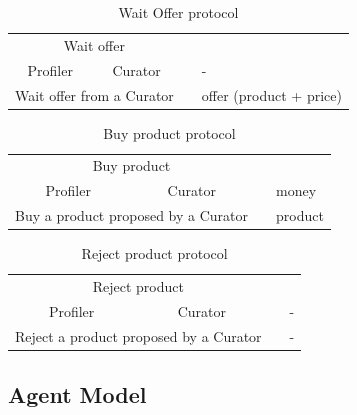 \documentclass[a4paper,11pt]{report}
\begin{document}
  \begin{table}[ht!]
  \centering
  \begin{tabular}{|c|l|c|l|ll}
  \cline{1-4}
  \multicolumn{4}{|c|}{Wait offer}   &  &  \\ \cline{1-4}
  \multicolumn{2}{|C{3.5cm}|}{Profiler} & \multicolumn{2}{C{3.5cm}|}{Curator} &  & - \\ \cline{1-5}
  \multicolumn{4}{|m{7cm}|}{Wait offer from a Curator}  &  & offer (product + price) \\ \cline{1-5}
  \end{tabular}
  \caption{Wait Offer protocol}
  \label{table:wait_offer_protocol}
  \end{table}
  
  \begin{table}[ht!]
  \centering
  \begin{tabular}{|c|l|c|l|ll}
  \cline{1-4}
  \multicolumn{4}{|c|}{Buy product}   &  &  \\ \cline{1-4}
  \multicolumn{2}{|C{3.5cm}|}{Profiler} & \multicolumn{2}{C{3.5cm}|}{Curator} &  & money \\ \cline{1-5}
  \multicolumn{4}{|m{7cm}|}{Buy a product proposed by a Curator}  &  & product \\ \cline{1-5}
  \end{tabular}
  \caption{Buy product protocol}
  \label{table:buy_product_protocol}
  \end{table}
  
  \begin{table}[ht!]
  \centering
  \begin{tabular}{|c|l|c|l|ll}
  \cline{1-4}
  \multicolumn{4}{|c|}{Reject product}   &  &  \\ \cline{1-4}
  \multicolumn{2}{|C{3.5cm}|}{Profiler} & \multicolumn{2}{C{3.5cm}|}{Curator} &  & - \\ \cline{1-5}
  \multicolumn{4}{|m{7cm}|}{Reject a product proposed by a Curator}  &  & - \\ \cline{1-5}
  \end{tabular}
  \caption{Reject product protocol}
  \label{table:reject_product_protocol}
  \end{table}
  
  \subsection{Agent Model}
  
  
\end{document}
